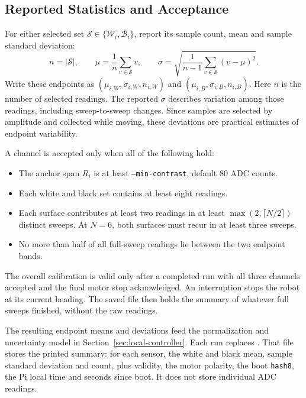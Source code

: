 \clearpage
\subsection{Reported Statistics and Acceptance}
For either selected set $\mathcal S\in\{\mathcal W_i,\mathcal B_i\}$, report its sample count, mean and sample standard deviation:
\begin{equation}
n=|\mathcal S|,\qquad
\mu=\frac{1}{n}\sum_{v\in\mathcal S}v,\qquad
\sigma=\sqrt{\frac{1}{n-1}\sum_{v\in\mathcal S}(v-\mu)^2}.
\label{eq:calib-mean-std}
\end{equation}
Write these endpoints as $(\mu_{i,W},\sigma_{i,W},n_{i,W})$ and $(\mu_{i,B},\sigma_{i,B},n_{i,B})$. Here $n$ is the number of selected readings. The reported $\sigma$ describes variation among those readings, including sweep-to-sweep changes. Since samples are selected by amplitude and collected while moving, these deviations are practical estimates of endpoint variability.

A channel is accepted only when all of the following hold:
\begin{itemize}
    \item The anchor span $R_i$ is at least \texttt{--min-contrast}, default 80 ADC counts.
    \item Each white and black set contains at least eight readings.
    \item Each surface contributes at least two readings in at least $\max(2,\lceil N/2\rceil)$ distinct sweeps. At $N=6$, both surfaces must recur in at least three sweeps.
    \item No more than half of all full-sweep readings lie between the two endpoint bands.
\end{itemize}
The overall calibration is valid only after a completed run with all three channels accepted and the final motor stop acknowledged. An interruption stops the robot at its current heading. The saved file then holds the summary of whatever full sweeps finished, without the raw readings.

The resulting endpoint means and deviations feed the normalization and uncertainty model in Section~\ref{sec:local-controller}. Each run replaces . That file stores the printed summary: for each sensor, the white and black mean, sample standard deviation and count, plus validity, the motor polarity, the boot \texttt{hash8}, the Pi local time and seconds since boot. It does not store individual ADC readings.


